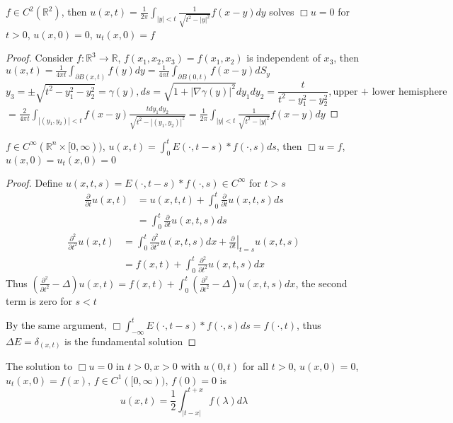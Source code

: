 \documentclass[main]{subfiles}
\begin{document}
\begin{theorem}
$f\in C^2(\mathbb R^2)$, then $\displaystyle u(x,t)=\frac{1}{2\pi}\int_{|y|<t}\frac{1}{\sqrt{t^2-|y|^2}}f(x-y)dy$ solves $\Box u=0$ for $t>0$, $u(x,0)=0$, $u_t(x,0)=f$
\end{theorem}

\begin{proof}
Consider $f:\mathbb R^3\to\mathbb R$, $f(x_1,x_2,x_3)=f(x_1,x_2)$ is independent of $x_3$, then $\displaystyle u(x,t)=\frac{1}{4\pi t}\int_{\partial B(x,t)}f(y)dy=\frac{1}{4\pi t}\int_{\partial B(0,t)}f(x-y)dS_y$
\[y_3=\pm\sqrt{t^2-y_1^2-y_2^2}=\gamma(y), ds=\sqrt{1+|\nabla\gamma(y)|^2}dy_1dy_2=\frac{t}{t^2-y_1^2-y_2^2}, \text{upper + lower hemisphere}\]
$\displaystyle=\frac{2}{4\pi t}\int_{|(y_1,y_2)|<t}f(x-y)\frac{tdy_1dy_2}{\sqrt{t^2-|(y_1,y_2)|^2}}=\frac{1}{2\pi}\int_{|y|<t}\frac{1}{\sqrt{t^2-|y|^2}}f(x-y)dy$
\end{proof}

\begin{theorem}
$f\in C^\infty(\mathbb R^n\times[0,\infty))$, $\displaystyle u(x,t)=\int_0^tE(\cdot,t-s)*f(\cdot,s)ds$, then $\Box u=f$, $u(x,0)=u_t(x,0)=0$
\end{theorem}

\begin{proof}
Define $u(x,t,s)=E(\cdot,t-s)*f(\cdot,s)\in C^\infty$ for $t>s$
\begin{align*}
\frac{\partial}{\partial t}u(x,t)&=u(x,t,t)+\int_0^t\frac{\partial}{\partial t}u(x,t,s)ds \\
&=\int_0^t\frac{\partial}{\partial t}u(x,t,s)ds
\end{align*}
\begin{align*}
\frac{\partial^2}{\partial t^2}u(x,t)&=\int_0^t\frac{\partial^2}{\partial t^2}u(x,t,s)dx+\left.\frac{\partial}{\partial t}\right|_{t=s}u(x,t,s) \\
&=f(x,t)+\int_0^t\frac{\partial^2}{\partial t^2}u(x,t,s)dx
\end{align*}
Thus $\displaystyle\left(\frac{\partial^2}{\partial t^2}-\Delta\right)u(x,t)=f(x,t)+\int_0^t\left(\frac{\partial^2}{\partial t^2}-\Delta\right)u(x,t,s)dx$, the second term is zero for $s<t$ \par
By the same argument, $\displaystyle\Box\int_{-\infty}^tE(\cdot,t-s)*f(\cdot,s)ds=f(\cdot,t)$, thus $\Delta E=\delta_{(x,t)}$ is the fundamental solution
\end{proof}

\begin{lemma}\label{1 dim wave equation reflection}
The solution to $\Box u=0$ in $t>0,x>0$ with $u(0,t)$ for all $t>0$, $u(x,0)=0$, $u_t(x,0)=f(x)$, $f\in C^1([0,\infty))$, $f(0)=0$ is
\[u(x,t)=\frac{1}{2}\int_{|t-x|}^{t+x}f(\lambda)d\lambda\]
\end{lemma}
\end{document}
